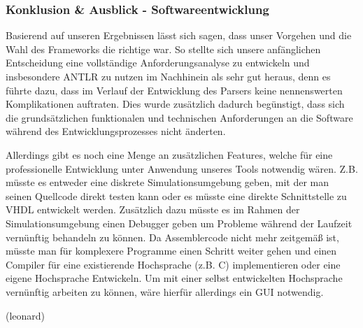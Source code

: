 \documentclass[paper=a4,fontsize=12pt,twocolumn]{scrreprt}
\begin{document}
\subsubsection{Konklusion \& Ausblick - Softwareentwicklung}
Basierend auf unseren Ergebnissen lässt sich sagen, dass unser Vorgehen und die Wahl des Frameworks die richtige war. 
So stellte sich unsere anfänglichen Entscheidung eine vollständige Anforderungsanalyse zu entwickeln und insbesondere ANTLR zu nutzen im Nachhinein als sehr gut heraus, denn es führte dazu, dass im Verlauf der Entwicklung des Parsers keine nennenswerten Komplikationen auftraten. Dies wurde zusätzlich dadurch begünstigt, dass sich die grundsätzlichen funktionalen und technischen Anforderungen an die Software während des Entwicklungsprozesses nicht änderten.

Allerdings gibt es noch eine Menge an zusätzlichen Features, welche für eine professionelle Entwicklung unter Anwendung unseres Tools notwendig wären. Z.B. müsste es entweder eine diskrete Simulationsumgebung geben, mit der man seinen Quellcode direkt testen kann oder es müsste eine direkte Schnittstelle zu VHDL %
entwickelt werden. Zusätzlich dazu müsste es im Rahmen der Simulationsumgebung einen Debugger geben um Probleme während der Laufzeit vernünftig behandeln zu können.
Da Assemblercode nicht mehr zeitgemäß ist, müsste man für komplexere Programme einen Schritt weiter gehen und einen Compiler für eine existierende Hochsprache (z.B. C) implementieren oder eine eigene Hochsprache Entwickeln. Um mit einer selbst entwickelten Hochsprache vernünftig arbeiten zu können, wäre hierfür allerdings ein GUI notwendig. %

(leonard)

\end{document}
